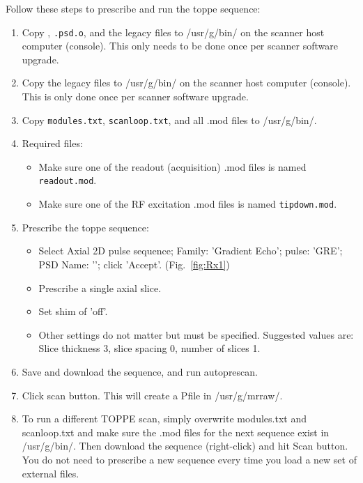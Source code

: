Follow these steps to prescribe and run the toppe sequence:
\begin{enumerate}
	\item Copy {\tt \psdname}, {\tt \psdname.psd.o}, and the legacy files to /usr/g/bin/ on the scanner host computer (console). This only needs to be done once per scanner software upgrade.
	\item Copy the legacy files to /usr/g/bin/ on the scanner host computer (console). This is only done once per scanner software upgrade.
	\item Copy {\tt modules.txt}, {\tt scanloop.txt}, and all .mod files to /usr/g/bin/.
	\item Required files:
	\begin{itemize}
		\item Make sure one of the readout (acquisition) .mod files is named {\tt readout.mod}.
		\item Make sure one of the RF excitation .mod files is named {\tt tipdown.mod}.
	\end{itemize}
	\item Prescribe the toppe sequence:
\begin{itemize}
	\item Select Axial 2D pulse sequence; Family: 'Gradient Echo'; pulse: 'GRE'; PSD Name: '\psdname'; click 'Accept'. (Fig.~\ref{fig:Rx1})
	\item Prescribe a single axial slice.
	\item Set shim of 'off'.
	\item Other settings do not matter but must be specified. Suggested values are: Slice thickness 3, slice spacing 0, number of slices 1.
\end{itemize}
	\item Save and download the sequence, and run autoprescan.
	\item Click scan button. This will create a Pfile in /usr/g/mrraw/.
	\item To run a different TOPPE scan, simply overwrite modules.txt and scanloop.txt and make sure the .mod files for the next sequence exist in /usr/g/bin/. Then download the sequence (right-click) and hit Scan button. You do not need to prescribe a new sequence every time you load a new set of external files.
\end{enumerate}



